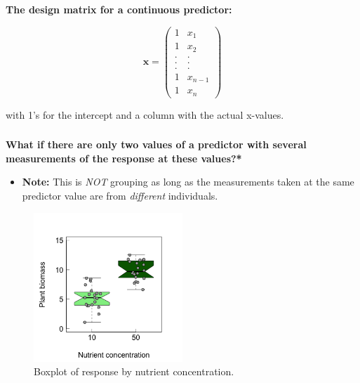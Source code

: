 \documentclass{beamer}
\begin{document}
\begin{frame}
  \frametitle{}
  \textbf{The design matrix for a continuous predictor:}

  \begin{equation*}
  \mathbf{x} = \left( \begin{array}{cc} 1 & x_{1} \\ 1 & x_{2} \\ . & . \\ . & . \\ . & . \\ 1 & x_{n-1} \\ 1 & x_n \end{array}\right)
  \end{equation*}

  with 1's for the intercept and a column with the actual x-values.
\end{frame}

\begin{frame}
  \frametitle{}
  \textbf{What if there are only two values of a predictor with several measurements of the response at these values?*}

  \begin{itemize}
    \item \textbf{Note:} This is \textit{NOT} grouping as long as the measurements taken at the same predictor value are from \textit{different} individuals.
  \end{itemize}
  
  \begin{figure}[h]
    \centering
    \includegraphics[width=0.5\textwidth]{lectures/day_3_LM_refresh_II/figures/unnamed-chunk-8-1.png} 
    \caption{Boxplot of response by nutrient concentration.}
  \end{figure}
\end{frame}
\end{document}
